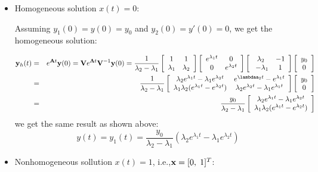 \begin{itemize}
\item Homogeneous solution $x(t)=0$:

  Assuming $y_1(0)=y(0)=y_0$ and $y_2(0)=y'(0)=0$, we get the homogeneous 
  solution:

  \begin{eqnarray}
  {\bf y}_h(t)&=&e^{{\bf A}t}{\bf y}(0)={\bf V}e^{{\bf\Lambda}t}{\bf V}^{-1}{\bf y}(0)
  =\frac{1}{\lambda_2-\lambda_1}
  \left[\begin{array}{cc} 1 & 1\\\lambda_1&\lambda_2\end{array}\right]
  \left[\begin{array}{cc} e^{\lambda_1t} & 0\\0 & e^{\lambda_2t}\end{array}\right]
  \left[\begin{array}{cc} \lambda_2 & -1\\\ -\lambda_1&1\end{array}\right]
  \left[\begin{array}{c} y_0 \\ 0\end{array}\right]
  \nonumber\\
  &=&\frac{1}{\lambda_2-\lambda_1}
  \left[\begin{array}{cc} \lambda_2e^{\lambda_1t}-\lambda_1e^{\lambda_2t}
      & e^{\lambdaa_2t}-e^{\lambda_1t}
      \\ \lambda_1\lambda_2(e^{\lambda_1 t}-e^{\lambda_2 t}) &
      \lambda_2 e^{\lambda_2t}-\lambda_1 e^{\lambda_1t}\end{array}\right]
  \left[\begin{array}{c} y_0 \\ 0\end{array}\right]
  \nonumber\\
  &=&\frac{y_0}{\lambda_2-\lambda_1}
  \left[\begin{array}{c} \lambda_2e^{\lambda_1t}-\lambda_1e^{\lambda_2t}\\
      \lambda_1\lambda_2(e^{\lambda_1t}-e^{\lambda_2t})
    \end{array}\right]
  \nonumber
  \end{eqnarray}
  we get the same result as shown above:
  \[
  y(t)=y_1(t)=\frac{y_0}{\lambda_2-\lambda_1}(\lambda_2e^{\lambda_1t}-\lambda_1e^{\lambda_2t})
  \]

\item Nonhomogeneous sollution $x(t)=1$, i.e.,${\bf x}=[0,\;1]^T$:


\end{itemize}
